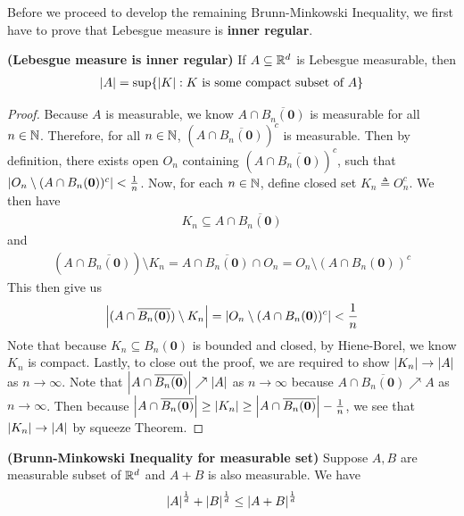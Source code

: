 \documentclass{report}
\begin{document}
\begin{mdframed}
Before we proceed to develop the remaining Brunn-Minkowski Inequality, we first have to prove that Lebesgue measure is  \textbf{inner regular}. 
\end{mdframed}
\begin{theorem}
\label{Lmi}
\textbf{(Lebesgue measure is inner regular)} If $A\subseteq \mathbb{R}^d$ is Lebesgue measurable, then 
\begin{align*}
\left|A\right|=\sup \{ \left|K\right|:K\text{ is some compact subset of  }A \}
\end{align*}
\end{theorem}
\begin{proof}
Because $A$ is measurable, we know $A\cap \overline{B_n(\textbf{0})}$ is measurable for all $n\in\mathbb{N}$. Therefore, for all $n\in\mathbb{N}$, $(A\cap \overline{B_n(\textbf{0})})^c$ is measurable. Then by definition, there exists open $O_n$ containing $(A\cap \overline{B_n(\textbf{0})})^c$,  such that $\left|O_n\setminus (A\cap B_n(\textbf{0}))^c \right|< \frac{1}{n}$. Now, for each $n\in\mathbb{N}$, define closed set $K_n\triangleq O_n^c$. We then have 
\begin{align*}
  K_n \subseteq A\cap \overline{B_n(\textbf{0})}
\end{align*}
and 
\begin{align*}
  (A\cap \overline{B_n(\textbf{0})}) \setminus K_n= A\cap \overline{B_n(\textbf{0})}\cap O_n=O_n \setminus (A\cap B_n(\textbf{0}))^c
\end{align*}
This then give us 
\begin{align*}
\left|(A\cap  \overline{B_n(\textbf{0})})\setminus K_n\right|=\left|O_n\setminus (A\cap B_n(\textbf{0}))^c \right|< \frac{1}{n}
\end{align*}
Note that because $K_n \subseteq B_n(\textbf{0})$ is bounded and closed, by Hiene-Borel, we know $K_n$ is compact. Lastly, to close out the proof, we are required to show $\left|K_n\right|\to \left|A\right|$ as $n \to \infty$. Note that $\left|A\cap \overline{B_n(\textbf{0}})\right|\nearrow \left|A\right|$ as $n\to \infty$  because $A\cap \overline{B_n(\textbf{0})}\nearrow A$ as $n\to \infty$. Then because $\left|A\cap \overline{B_n(\textbf{0})}\right|\geq \left|K_n\right|\geq \left|A\cap \overline{ B_n(\textbf{0})}\right|- \frac{1}{n}$, we see that $\left|K_n\right|\to \left|A\right|$ by squeeze Theorem. 
\end{proof}
\begin{theorem}
\textbf{(Brunn-Minkowski Inequality for measurable set)} Suppose $A,B$ are measurable subset of  $\mathbb{R}^d$ and $A+B$ is also measurable. We have 
 \begin{align*}
\left|A\right|^{\frac{1}{d}}+ \left|B\right|^{\frac{1}{d}}\leq \left|A+B\right|^{\frac{1}{d}}
\end{align*}
\end{theorem}
\end{document}
